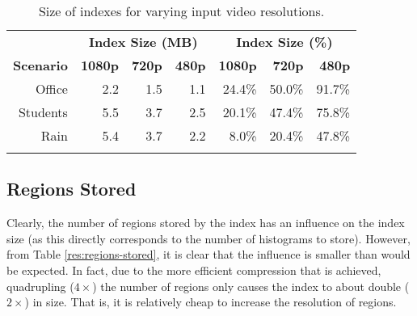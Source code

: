 \begin{table}[t]
    \caption{Size of indexes for varying input video resolutions.}\label{res:resolution-space}
	\centering
    \begin{tabular}{ r rrr rrr }
		~ & \multicolumn{3}{c|}{\textbf{Index Size (MB)}} & \multicolumn{3}{c}{\textbf{Index Size (\%)}} \\
		\cline{2-7}
	    \textbf{Scenario} & \textbf{1080p} & \textbf{720p} & \textbf{480p} & \textbf{1080p} & \textbf{720p} & \textbf{480p} \\ \hline\noalign{\smallskip}
		Office   		& 2.2 & 1.5 & 1.1 		& 24.4\% & 50.0\% & 91.7\%        \\
	    Students		& 5.5 & 3.7 & 2.5 		& 20.1\% & 47.4\% & 75.8\%        \\
	    Rain     		& 5.4 & 3.7 & 2.2 		&  8.0\% & 20.4\% & 47.8\%        \\\noalign{\smallskip}
        \hline
	   \end{tabular}
\end{table}


\subsection{Regions Stored}
Clearly, the number of regions stored by the index has an influence on the index size (as this directly corresponds to the number of histograms to store). However, from Table \ref{res:regions-stored}, it is clear that the influence is smaller than would be expected. In fact, due to the more efficient compression that is achieved, quadrupling ($4\times$) the number of regions only causes the index to about double ($2\times$) in size. That is, it is relatively cheap to increase the resolution of regions. 


